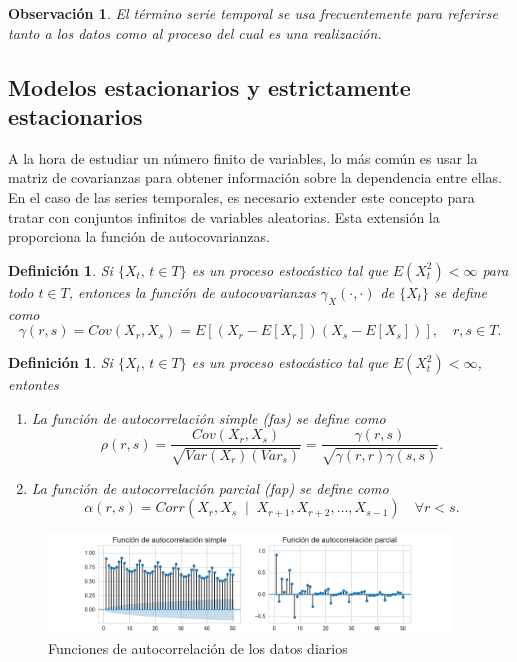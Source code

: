 \documentclass[12pt,twoside]{article}
\newtheorem{definition}[theorem]{Definición}
\newtheorem{remark}[theorem]{Observación}
\begin{document}
\begin{remark}
    El término serie temporal se usa frecuentemente para referirse tanto a los datos como al proceso del cual es una realización.
\end{remark}


\subsection{Modelos estacionarios y estrictamente estacionarios}
A la hora de estudiar un número finito de variables, lo más común es usar la matriz de covarianzas para obtener información sobre la dependencia entre ellas. En el caso de las series temporales, es necesario extender este concepto para tratar con conjuntos infinitos de variables aleatorias. Esta extensión la proporciona la función de autocovarianzas.

\begin{definition}
    Si $\{X_t, \, t\in T\}$ es un proceso estocástico tal que $E(X_t^2)<\infty$ para todo $t\in T$, entonces la función de autocovarianzas $\gamma_X(\cdot, \cdot)$ de $\{X_t\}$ se define como
    \begin{equation}\label{eq:fun_autocov}
        \gamma(r,s) = Cov(X_r, X_s) = E[(X_r - E[X_r])(X_s-E[X_s])], \quad r,s \in T.
    \end{equation}
\end{definition}


\begin{definition}
     Si $\{X_t, \, t\in T\}$ es un proceso estocástico tal que $E(X_t^2)<\infty$, entontes
     \begin{enumerate}
         \item La función de autocorrelación simple (fas) se define como
         \begin{equation}\label{eq:ACF}
             \rho(r,s) = \frac{Cov(X_r, X_s)}{\sqrt{Var(X_r)(Var_s)}} = \frac{\gamma(r,s)}{\sqrt{\gamma(r,r) \gamma(s,s)}}.
         \end{equation}
         \item La función de autocorrelación parcial (fap) se define como
         \begin{equation}\label{eq:PACF}
             \alpha(r,s) = Corr(X_r, X_s \;\mid\; X_{r+1}, X_{r+2}, \dotsc, X_{s-1}) \quad \forall r < s.
         \end{equation}
     \end{enumerate}
\end{definition} 

\begin{figure}[h]
\centering
\includegraphics[width = 0.95\textwidth]{imagenes/ACF+PACF.png}
\caption{Funciones de autocorrelación de los datos diarios}\label{fig:ACF+PACF}
\end{figure}
\end{document}
